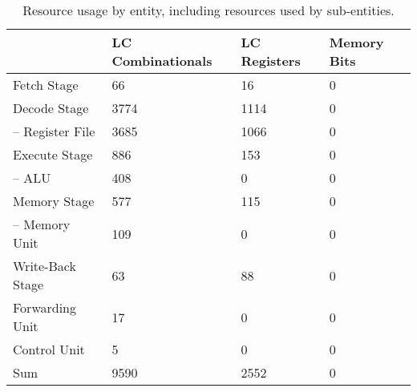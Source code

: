 \begin{table}[htb]
\centering
\caption{Resource usage by entity, including resources used by sub-entities.}
\begin{tabular}{llll}
	\toprule
	                     & LC Combinationals & LC Registers & Memory Bits \\
	\midrule
	Fetch Stage          & 66                  & 16             &0             \\
	Decode Stage         & 3774                & 1114              &0             \\
	-- Register File     & 3685                & 1066             & 0            \\
	Execute Stage        & 886                 & 153             &  0           \\
	-- ALU               & 408                  & 0             &0             \\
	Memory Stage         & 577                  & 115             &0             \\
	-- Memory Unit       & 109                  & 0             &   0          \\
	Write-Back Stage     & 63                  & 88             & 0            \\
	Forwarding Unit      & 17                  & 0             &  0           \\
	Control Unit         & 5                   & 0              & 0            \\
	\cmidrule{1-4}
	Sum                  & 9590                  &2552              & 0             \\
\bottomrule
\end{tabular}
\end{table}

\begin{qa}
\end{qa}

